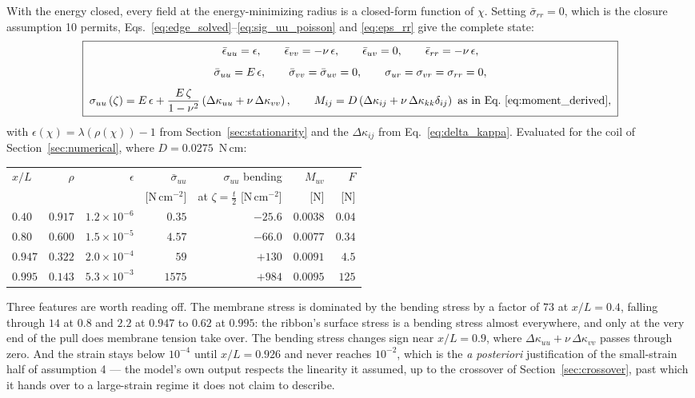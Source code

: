 \documentclass[11pt]{article}
\begin{document}
With the energy closed, every field at the energy-minimizing radius is a
closed-form function of $\chi$. Setting $\bar\sigma_{rr}=0$, which is the closure
assumption 10 permits, Eqs.~\eqref{eq:edge_solved}--\eqref{eq:sig_uu_poisson} and
\eqref{eq:eps_rr} give the complete state:
\begin{equation}\label{eq:state}
    \boxed{\;
    \begin{gathered}
    \bar\epsilon_{uu} = \epsilon,\qquad
    \bar\epsilon_{vv} = -\nu\,\epsilon,\qquad
    \bar\epsilon_{uv} = 0,\qquad
    \bar\epsilon_{rr} = -\nu\,\epsilon,\\[4pt]
    \bar\sigma_{uu} = E\,\epsilon,\qquad
    \bar\sigma_{vv} = \bar\sigma_{uv} = 0,\qquad
    \sigma_{ur} = \sigma_{vr} = \sigma_{rr} = 0,\\[4pt]
    \sigma_{uu}\left(\zeta\right) = E\,\epsilon
      + \frac{E\,\zeta}{1-\nu^{2}}
        \left(\Delta\kappa_{uu} + \nu\,\Delta\kappa_{vv}\right),
    \qquad
    M_{ij} = D\left(\Delta\kappa_{ij}
      + \nu\,\Delta\kappa_{kk}\delta_{ij}\right)\ \text{as in
      Eq.~\eqref{eq:moment_derived}},
    \end{gathered}\;}
\end{equation}
with $\epsilon(\chi) = \lambda\left(\rho(\chi)\right)-1$ from
Section~\ref{sec:stationarity} and the $\Delta\kappa_{ij}$ from
Eq.~\eqref{eq:delta_kappa}. Evaluated for the coil of
Section~\ref{sec:numerical}, where $D = 0.0275$~N\,cm:
\begin{center}
\begin{tabular}{lrrrrrr}
\toprule
$x/L$ & $\rho$ & $\epsilon$ & $\bar\sigma_{uu}$ & $\sigma_{uu}$ bending
  & $M_{uv}$ & $F$\\
 & & & [N\,cm$^{-2}$] & at $\zeta=\tfrac t2$ [N\,cm$^{-2}$]
  & [N] & [N]\\
\midrule
$0.40$  & $0.917$ & $1.2\times10^{-6}$ & $0.35$  & $-25.6$  & $0.0038$ & $0.04$\\
$0.80$  & $0.600$ & $1.5\times10^{-5}$ & $4.57$  & $-66.0$  & $0.0077$ & $0.34$\\
$0.947$ & $0.322$ & $2.0\times10^{-4}$ & $59$    & $+130$   & $0.0091$ & $4.5$\\
$0.995$ & $0.143$ & $5.3\times10^{-3}$ & $1575$  & $+984$   & $0.0095$ & $125$\\
\bottomrule
\end{tabular}
\end{center}
Three features are worth reading off. The membrane stress is dominated by the
bending stress by a factor of $73$ at $x/L=0.4$, falling through $14$ at $0.8$
and $2.2$ at $0.947$ to $0.62$ at $0.995$: the ribbon's surface stress is a
bending stress almost everywhere, and only at the very end of the pull does
membrane tension take over. The bending stress changes sign near $x/L=0.9$, where
$\Delta\kappa_{uu}+\nu\,\Delta\kappa_{vv}$ passes through zero. And the strain
stays below $10^{-4}$ until $x/L = 0.926$ and never reaches $10^{-2}$, which is
the \emph{a posteriori}
justification of the small-strain half of assumption 4 --- the model's own output
respects the linearity it assumed, up to the crossover of
Section~\ref{sec:crossover}, past which it hands over to a large-strain regime it
does not claim to describe.
\end{document}
